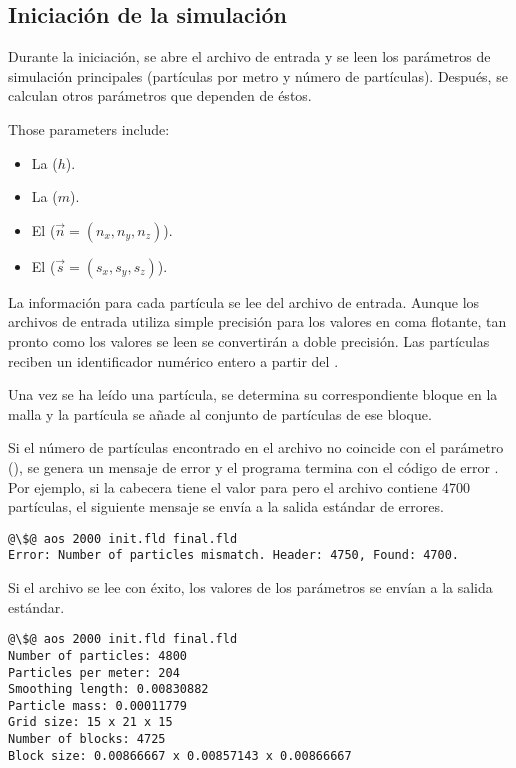 \subsection{Iniciación de la simulación}

Durante la iniciación, se abre el archivo de entrada y se leen los parámetros de
simulación principales (partículas por metro y número de partículas).
Después, se calculan otros parámetros que dependen de éstos.

Those parameters include:
\begin{itemize}
\item La  ($h$).
\item La  ($m$).
\item El  ($\vec{n} = (n_x, n_y, n_z)$).
\item El  ($\vec{s} = (s_x, s_y, s_z)$).
\end{itemize}

La información para cada partícula se lee del archivo de entrada. Aunque los
archivos de entrada utiliza simple precisión para los valores en coma flotante,
tan pronto como los valores se leen se convertirán a doble precisión. Las
partículas reciben un identificador numérico entero a partir del .

Una vez se ha leído una partícula, se determina su correspondiente bloque en la
malla y la partícula se añade al conjunto de partículas de ese bloque.

Si el número de partículas encontrado en el archivo no coincide con el parámetro
 (), se genera un mensaje de error y
el programa termina con el código de error
. Por ejemplo, si la cabecera tiene el valor  para
 pero el archivo contiene 4700 partículas, el siguiente mensaje se
envía a la salida estándar de errores.

\begin{lstlisting}[style=terminal,escapechar=@]
@\$@ aos 2000 init.fld final.fld
Error: Number of particles mismatch. Header: 4750, Found: 4700.
\end{lstlisting}

Si el archivo se lee con éxito, los valores de los parámetros se envían a la
salida estándar.

\begin{lstlisting}[style=terminal,escapechar=@]
@\$@ aos 2000 init.fld final.fld
Number of particles: 4800
Particles per meter: 204
Smoothing length: 0.00830882
Particle mass: 0.00011779
Grid size: 15 x 21 x 15
Number of blocks: 4725
Block size: 0.00866667 x 0.00857143 x 0.00866667
\end{lstlisting}

